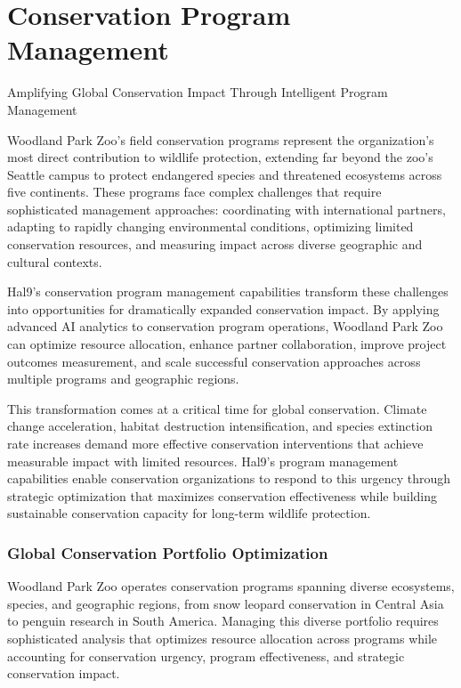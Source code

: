 \documentclass[
  Letterpaper,
]{scrbook}
\begin{document}

\chapter{Conservation Program
Management}\label{conservation-program-management}

Amplifying Global Conservation Impact Through Intelligent Program
Management

\hfill\break

Woodland Park Zoo's field conservation programs represent the
organization's most direct contribution to wildlife protection,
extending far beyond the zoo's Seattle campus to protect endangered
species and threatened ecosystems across five continents. These programs
face complex challenges that require sophisticated management
approaches: coordinating with international partners, adapting to
rapidly changing environmental conditions, optimizing limited
conservation resources, and measuring impact across diverse geographic
and cultural contexts.

Hal9's conservation program management capabilities transform these
challenges into opportunities for dramatically expanded conservation
impact. By applying advanced AI analytics to conservation program
operations, Woodland Park Zoo can optimize resource allocation, enhance
partner collaboration, improve project outcomes measurement, and scale
successful conservation approaches across multiple programs and
geographic regions.

This transformation comes at a critical time for global conservation.
Climate change acceleration, habitat destruction intensification, and
species extinction rate increases demand more effective conservation
interventions that achieve measurable impact with limited resources.
Hal9's program management capabilities enable conservation organizations
to respond to this urgency through strategic optimization that maximizes
conservation effectiveness while building sustainable conservation
capacity for long-term wildlife protection.

\subsection{Global Conservation Portfolio
Optimization}\label{global-conservation-portfolio-optimization}

Woodland Park Zoo operates conservation programs spanning diverse
ecosystems, species, and geographic regions, from snow leopard
conservation in Central Asia to penguin research in South America.
Managing this diverse portfolio requires sophisticated analysis that
optimizes resource allocation across programs while accounting for
conservation urgency, program effectiveness, and strategic conservation
impact.
\end{document}
